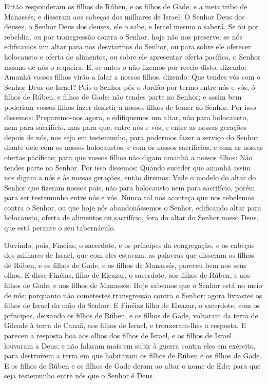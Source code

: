 Então responderam os filhos de Rúben, e os filhos de Gade, e a
meia tribo de Manassés, e disseram aos cabeças dos milhares de
Israel: O Senhor Deus dos deuses, o Senhor Deus dos deuses,
ele o sabe, e Israel mesmo o saberá. Se foi por rebeldia, ou por
transgressão contra o Senhor, hoje não nos preserve; se nós
edificamos um altar para nos desviarmos do Senhor, ou para sobre ele
oferecer holocausto e oferta de alimentos, ou sobre ele apresentar
oferta pacífica, o Senhor mesmo de nós o requeira. E, se
antes o não fizemos por receio disto, dizendo: Amanhã vossos filhos
virão a falar a nossos filhos, dizendo: Que tendes vós com o Senhor
Deus de Israel? Pois o Senhor pôs o Jordão por termo entre
nós e vós, ó filhos de Rúben, e filhos de Gade; não tendes parte no
Senhor; e assim bem poderiam vossos filhos fazer desistir a nossos
filhos de temer ao Senhor. Por isso dissemos: Preparemo-nos
agora, e edifiquemos um altar, não para holocausto, nem para
sacrifício, mas para que, entre nós e vós, e entre as nossas
gerações depois de nós, nos seja em testemunho, para podermos fazer
o serviço do Senhor diante dele com os nossos holocaustos, e com os
nossos sacrifícios, e com as nossas ofertas pacíficas; para que
vossos filhos não digam amanhã a nossos filhos: Não tendes parte no
Senhor. Por isso dissemos: Quando suceder que amanhã assim
nos digam a nós e às nossas gerações, então diremos: Vede o modelo
do altar do Senhor que fizeram nossos pais, não para holocausto nem
para sacrifício, porém para ser testemunho entre nós e vós.
Nunca tal nos aconteça que nos rebelemos contra o Senhor, ou
que hoje nós abandonássemos o Senhor, edificando altar para
holocausto, oferta de alimentos ou sacrifício, fora do altar do
Senhor nosso Deus, que está perante o seu tabernáculo.

Ouvindo, pois, Finéias, o sacerdote, e os príncipes da
congregação, e os cabeças dos milhares de Israel, que com eles
estavam, as palavras que disseram os filhos de Rúben, e os filhos de
Gade, e os filhos de Manassés, pareceu bem aos seus olhos. E
disse Finéias, filho de Eleazar, o sacerdote, aos filhos de Rúben, e
aos filhos de Gade, e aos filhos de Manassés: Hoje sabemos que o
Senhor está no meio de nós; porquanto não cometestes transgressão
contra o Senhor; agora livrastes os filhos de Israel da mão do
Senhor. E Finéias filho de Eleazar, o sacerdote, com os
príncipes, deixando os filhos de Rúben, e os filhos de Gade,
voltaram da terra de Gileade à terra de Canaã, aos filhos de Israel,
e trouxeram-lhes a resposta. E pareceu a resposta boa aos
olhos dos filhos de Israel, e os filhos de Israel louvaram a Deus; e
não falaram mais em subir à guerra contra eles em exército, para
destruírem a terra em que habitavam os filhos de Rúben e os filhos
de Gade. E os filhos de Rúben e os filhos de Gade deram ao
altar o nome de Ede; para que seja testemunho entre nós que o Senhor
é Deus.

